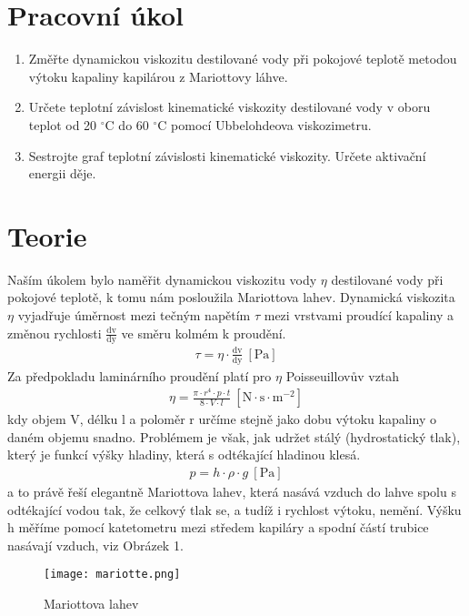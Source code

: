 \documentclass{article}
\author{"Patrik Novotný"}
\begin{document}
\section*{Pracovní úkol}
\begin{enumerate}
\item Změřte dynamickou viskozitu destilované vody při pokojové teplotě metodou výtoku kapaliny kapilárou z Mariottovy láhve.
\item Určete teplotní závislost kinematické viskozity destilované vody v oboru teplot od 20 $^{\circ}$C do 60 $^{\circ}$C pomocí Ubbelohdeova viskozimetru.
\item Sestrojte graf teplotní závislosti kinematické viskozity. Určete aktivační energii děje.
\end{enumerate}
\section*{Teorie}
\par Naším úkolem bylo naměřit dynamickou viskozitu vody $\eta$ destilované vody při pokojové teplotě, k tomu nám posloužila Mariottova lahev. Dynamická viskozita $\eta$ vyjadřuje úměrnost mezi tečným napětím $\tau$ mezi vrstvami proudící kapaliny a změnou rychlosti $\mathrm{\frac{dv}{dy}}$ ve směru kolmém k proudění.
\begin{align}
\tau = \eta \cdot \mathrm{\frac{dv}{dy}} \:  \mathrm{[Pa]}
\end{align}
Za předpokladu laminárního proudění platí pro $\eta$ Poisseuillovův vztah
\begin{align}
\eta = \frac{\pi \cdot r^{4}  \cdot p \cdot t}{8\cdot V \cdot l}\:  \mathrm{[N \cdot s \cdot m^{-2}]}
\end{align}
kdy objem V, délku l a poloměr r určíme stejně jako dobu výtoku kapaliny o daném objemu snadno. Problémem je však, jak udržet stálý (hydrostatický tlak), který je funkcí výšky hladiny, která s odtékající hladinou klesá.
\begin{align}
p = h\cdot \rho \cdot g \:  \mathrm{[Pa]}
\end{align}
a to právě řeší elegantně Mariottova lahev, která nasává vzduch do lahve spolu s odtékající vodou tak, že celkový tlak se, a tudíž i rychlost výtoku, nemění. Výšku h měříme pomocí katetometru mezi středem kapiláry a spodní částí trubice nasávají vzduch, viz Obrázek 1.
\begin{figure}[H]
\centering
\caption{Mariottova lahev}
\texttt{[image: mariotte.png]}
\end{figure}
\end{document}
